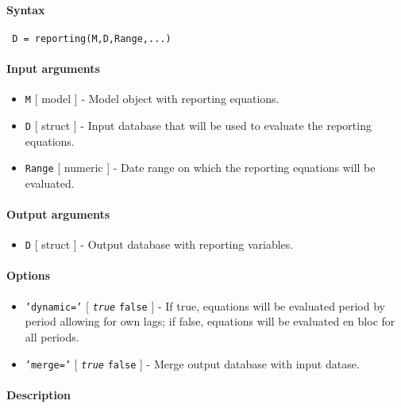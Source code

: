 


	\paragraph{Syntax}
 
 \begin{verbatim}
 D = reporting(M,D,Range,...)
 \end{verbatim}
 
 \paragraph{Input arguments}
 
 \begin{itemize}
 \item
   \texttt{M} {[} model {]} - Model object with reporting equations.
 \item
   \texttt{D} {[} struct {]} - Input database that will be used to
   evaluate the reporting equations.
 \item
   \texttt{Range} {[} numeric {]} - Date range on which the reporting
   equations will be evaluated.
 \end{itemize}
 
 \paragraph{Output arguments}
 
 \begin{itemize}
 \item
   \texttt{D} {[} struct {]} - Output database with reporting variables.
 \end{itemize}
 
 \paragraph{Options}
 
 \begin{itemize}
 \item
   \texttt{'dynamic='} {[} \emph{\texttt{true}} \textbar{} \texttt{false}
   {]} - If true, equations will be evaluated period by period allowing
   for own lags; if false, equations will be evaluated en bloc for all
   periods.
 \item
   \texttt{'merge='} {[} \emph{\texttt{true}} \textbar{} \texttt{false}
   {]} - Merge output database with input datase.
 \end{itemize}
 
 \paragraph{Description}



